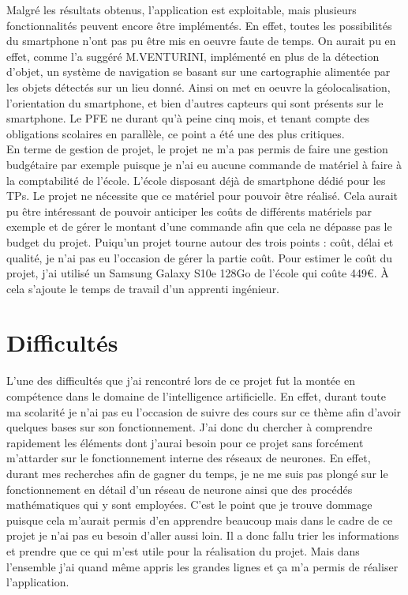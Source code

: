 \documentclass[UTF8]{EPURapport}
\begin{document}
Malgré les résultats obtenus, l'application est exploitable, mais plusieurs fonctionnalités peuvent encore être implémentés. En effet, toutes les possibilités du smartphone n'ont pas pu être mis en oeuvre faute de temps. On aurait pu en effet, comme l'a suggéré M.VENTURINI, implémenté en plus de la détection d'objet, un système de navigation se basant sur une cartographie alimentée par les objets détectés sur un lieu donné. Ainsi on met en oeuvre la géolocalisation, l'orientation du smartphone, et bien d'autres capteurs qui sont présents sur le smartphone. Le PFE ne durant qu'à peine cinq mois, et tenant compte des obligations scolaires en parallèle, ce point a été une des plus critiques.\\

En terme de gestion de projet, le projet ne m'a pas permis de faire une gestion budgétaire par exemple puisque je n'ai eu aucune commande de matériel à faire à la comptabilité de l'école. L'école disposant déjà de smartphone dédié pour les TPs. Le projet ne nécessite que ce matériel pour pouvoir être réalisé. Cela aurait pu être intéressant de pouvoir anticiper les coûts de différents matériels par exemple et de gérer le montant d'une commande afin que cela ne dépasse pas le budget du projet. Puiqu'un projet tourne autour des trois points : coût, délai et qualité, je n'ai pas eu l'occasion de gérer la partie coût. Pour estimer le coût du projet, j'ai utilisé un Samsung Galaxy S10e 128Go de l'école qui coûte 449€. À cela s'ajoute le temps de travail d'un apprenti ingénieur.

\section{Difficultés}

L'une des difficultés que j'ai rencontré lors de ce projet fut la montée en compétence dans le domaine de l'intelligence artificielle. En effet, durant toute ma scolarité je n'ai pas eu l'occasion de suivre des cours sur ce thème afin d'avoir quelques bases sur son fonctionnement. J'ai donc du chercher à comprendre rapidement les éléments dont j'aurai besoin pour ce projet sans forcément m'attarder sur le fonctionnement interne des réseaux de neurones. En effet, durant mes recherches afin de gagner du temps, je ne me suis pas plongé sur le fonctionnement en détail d'un réseau de neurone ainsi que des procédés mathématiques qui y sont employées. C'est le point que je trouve dommage puisque cela m'aurait permis d'en apprendre beaucoup mais dans le cadre de ce projet je n'ai pas eu besoin d'aller aussi loin. Il a donc fallu trier les informations et prendre que ce qui m'est utile pour la réalisation du projet. Mais dans l'ensemble j'ai quand même appris les grandes lignes et ça m'a permis de réaliser l'application.\\
\end{document}
